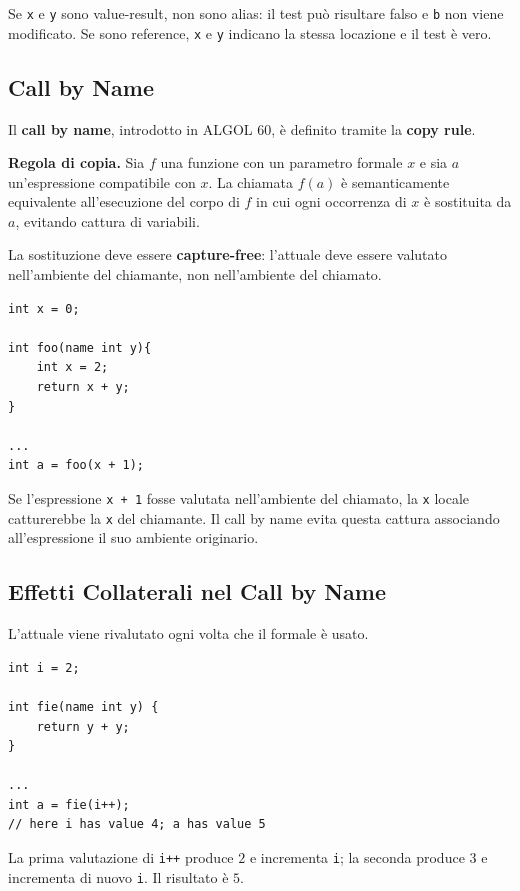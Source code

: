 \documentclass{article}
\begin{document}
Se \texttt{x} e \texttt{y} sono value-result, non sono alias: il test può risultare falso e \texttt{b} non viene modificato. Se sono reference, \texttt{x} e \texttt{y} indicano la stessa locazione e il test è vero.

\subsection{Call by Name}

Il \textbf{call by name}, introdotto in ALGOL 60, è definito tramite la \textbf{copy rule}.

\textbf{Regola di copia.} Sia $f$ una funzione con un parametro formale $x$ e sia $a$ un'espressione compatibile con $x$. La chiamata $f(a)$ è semanticamente equivalente all'esecuzione del corpo di $f$ in cui ogni occorrenza di $x$ è sostituita da $a$, evitando cattura di variabili.

La sostituzione deve essere \textbf{capture-free}: l'attuale deve essere valutato nell'ambiente del chiamante, non nell'ambiente del chiamato.

\begin{lstlisting}
int x = 0;

int foo(name int y){
    int x = 2;
    return x + y;
}

...
int a = foo(x + 1);
\end{lstlisting}

Se l'espressione \texttt{x + 1} fosse valutata nell'ambiente del chiamato, la \texttt{x} locale catturerebbe la \texttt{x} del chiamante. Il call by name evita questa cattura associando all'espressione il suo ambiente originario.

\subsection{Effetti Collaterali nel Call by Name}

L'attuale viene rivalutato ogni volta che il formale è usato.

\begin{lstlisting}
int i = 2;

int fie(name int y) {
    return y + y;
}

...
int a = fie(i++);
// here i has value 4; a has value 5
\end{lstlisting}

La prima valutazione di \texttt{i++} produce $2$ e incrementa \texttt{i}; la seconda produce $3$ e incrementa di nuovo \texttt{i}. Il risultato è $5$.
\end{document}
